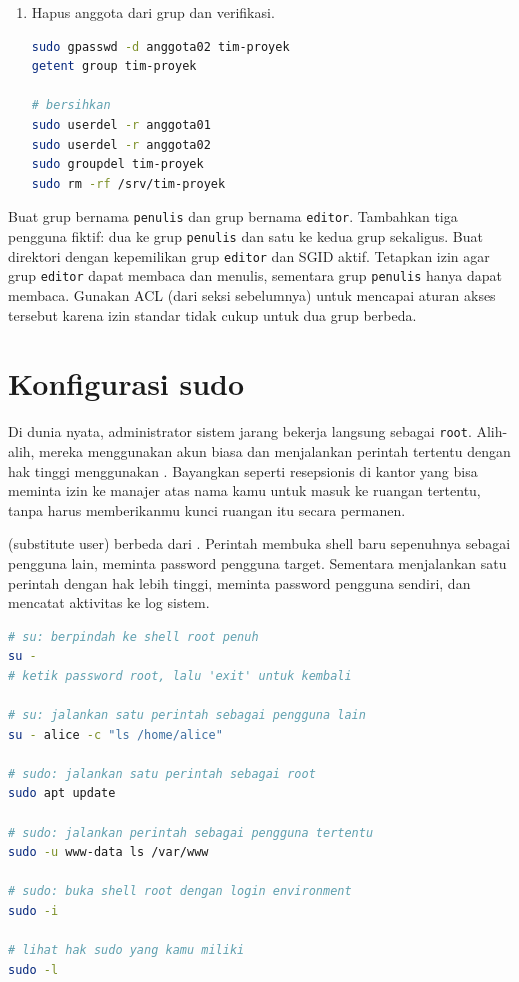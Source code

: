 \begin{enumerate}
    \item Hapus anggota dari grup dan verifikasi.
\begin{lstlisting}[language=bash, caption={Hapus anggota dan verifikasi}]
sudo gpasswd -d anggota02 tim-proyek
getent group tim-proyek

# bersihkan
sudo userdel -r anggota01
sudo userdel -r anggota02
sudo groupdel tim-proyek
sudo rm -rf /srv/tim-proyek
\end{lstlisting}
\end{enumerate}

\begin{challengebox}
Buat grup bernama \texttt{penulis} dan grup bernama \texttt{editor}. Tambahkan tiga pengguna fiktif: dua ke grup \texttt{penulis} dan satu ke kedua grup sekaligus. Buat direktori  dengan kepemilikan grup \texttt{editor} dan SGID aktif. Tetapkan izin agar grup \texttt{editor} dapat membaca dan menulis, sementara grup \texttt{penulis} hanya dapat membaca. Gunakan ACL (dari seksi sebelumnya) untuk mencapai aturan akses tersebut karena izin standar tidak cukup untuk dua grup berbeda.
\end{challengebox}

\section{Konfigurasi sudo}
\label{sec:sudo-config}

Di dunia nyata, administrator sistem jarang bekerja langsung sebagai \texttt{root}. Alih-alih, mereka menggunakan akun biasa dan menjalankan perintah tertentu dengan hak tinggi menggunakan . Bayangkan  seperti resepsionis di kantor yang bisa meminta izin ke manajer atas nama kamu untuk masuk ke ruangan tertentu, tanpa harus memberikanmu kunci ruangan itu secara permanen.

 (substitute user) berbeda dari . Perintah  membuka shell baru sepenuhnya sebagai pengguna lain, meminta password pengguna target. Sementara  menjalankan satu perintah dengan hak lebih tinggi, meminta password pengguna sendiri, dan mencatat aktivitas ke log sistem.

\begin{lstlisting}[language=bash, caption={Perbedaan penggunaan su dan sudo}]
# su: berpindah ke shell root penuh
su -
# ketik password root, lalu 'exit' untuk kembali

# su: jalankan satu perintah sebagai pengguna lain
su - alice -c "ls /home/alice"

# sudo: jalankan satu perintah sebagai root
sudo apt update

# sudo: jalankan perintah sebagai pengguna tertentu
sudo -u www-data ls /var/www

# sudo: buka shell root dengan login environment
sudo -i

# lihat hak sudo yang kamu miliki
sudo -l
\end{lstlisting}

